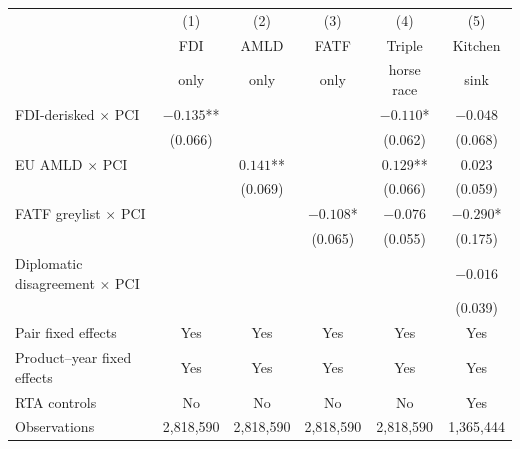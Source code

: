 \begin{tabular}{lccccc}
\toprule
                              & (1)        & (2)        & (3)        & (4)        & (5)        \\
                              & FDI        & AMLD       & FATF       & Triple     & Kitchen    \\
                              & only       & only       & only       & horse race & sink       \\
\midrule
FDI-derisked $\times$ PCI     & $-0.135$** &            &            & $-0.110$*  & $-0.048$   \\
                              & (0.066)    &            &            & (0.062)    & (0.068)    \\
EU AMLD $\times$ PCI          &            & $0.141$**  &            & $0.129$**  & $0.023$    \\
                              &            & (0.069)    &            & (0.066)    & (0.059)    \\
FATF greylist $\times$ PCI    &            &            & $-0.108$*  & $-0.076$   & $-0.290$*  \\
                              &            &            & (0.065)    & (0.055)    & (0.175)    \\
Diplomatic disagreement $\times$ PCI &     &            &            &            & $-0.016$   \\
                              &            &            &            &            & (0.039)    \\
\midrule
Pair fixed effects            & Yes        & Yes        & Yes        & Yes        & Yes        \\
Product--year fixed effects   & Yes        & Yes        & Yes        & Yes        & Yes        \\
RTA controls                  & No         & No         & No         & No         & Yes        \\
Observations                  & 2,818,590  & 2,818,590  & 2,818,590  & 2,818,590  & 1,365,444  \\
\bottomrule
\end{tabular}
